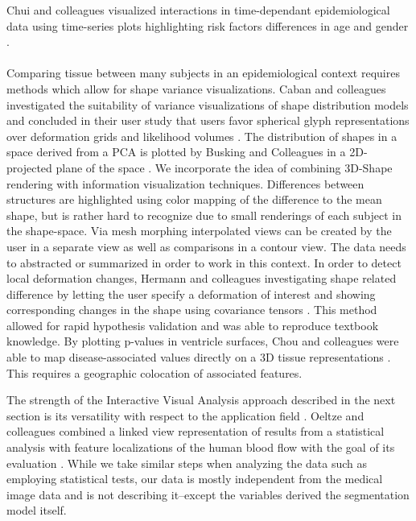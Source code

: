 \documentclass[journal]{style/vgtc} 			          %
\begin{document}
Chui and colleagues visualized interactions in time-dependant epidemiological data using time-series plots highlighting risk factors differences in age and gender \cite{Chui2011}.
%
\\\\
Comparing tissue between many subjects in an epidemiological context requires methods which allow for shape variance visualizations.
%
Caban and colleagues investigated the suitability of variance visualizations of shape distribution models and concluded in their user study that users favor spherical glyph representations over deformation grids and likelihood volumes \cite{Caban2011}.
%
The distribution of shapes in a space derived from a PCA is plotted by Busking and Colleagues in a 2D-projected plane of the space \cite{Busking2010a}.
%
We incorporate the idea of combining 3D-Shape rendering with information visualization techniques.
%
Differences between structures are highlighted using color mapping of the difference to the mean shape, but is rather hard to recognize due to small renderings of each subject in the shape-space.
%
Via mesh morphing interpolated views can be created by the user in a separate view as well as comparisons in a contour view.
%
%
The data needs to abstracted or summarized in order to work in this context.
%
In order to detect local deformation changes, Hermann and colleagues investigating shape related difference by letting the user specify a deformation of interest and showing corresponding changes in the shape using covariance tensors \cite{Hermann2014}.
%
This method allowed for rapid hypothesis validation and was able to reproduce textbook knowledge.
%
By plotting p-values in ventricle surfaces, Chou and colleagues were able to map disease-associated values directly on a 3D tissue representations \cite{Chou2009}.
%
This requires a geographic colocation of associated features.
%

The strength of the Interactive Visual Analysis approach described in the next section is its versatility with respect to the application field \cite{Konyha2009}.
%
Oeltze and colleagues combined a linked view representation of results from a statistical analysis with feature localizations of the human blood flow with the goal of its evaluation \cite{Oeltze2007}.
%
While we take similar steps when analyzing the data such as employing statistical tests, our data is mostly independent from the medical image data and is not describing it--except the variables derived the segmentation model itself.
\end{document}
